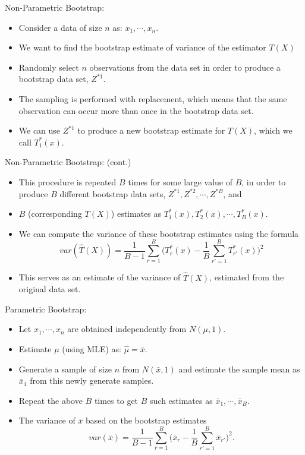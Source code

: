\documentclass[
  ignorenonframetext,
]{beamer}
\providecommand{\tightlist}{%
  \setlength{\itemsep}{0pt}\setlength{\parskip}{0pt}}
\begin{document}
\begin{frame}{Non-Parametric Bootstrap:}
\label{non-parametric-bootstrap}
\begin{itemize}
\tightlist
\item
  Consider a {data of size \(n\)} as: \(x_1, \cdots, x_n\).
\item
  We want to find the {bootstrap estimate of variance of the estimator
  \(T(X)\)}
\item
  {Randomly select \(n\) observations} from the data set in order to
  produce a bootstrap data set, \(Z^{*1}\).
\item
  The {sampling is performed with replacement,} which means that the
  same observation can occur more than once in the bootstrap data set.
\item
  We can use \(Z^{*1}\) to {produce a new bootstrap estimate} for
  \(T(X)\), which we call \(T_1^*(x)\).
\end{itemize}
\end{frame}

\begin{frame}{Non-Parametric Bootstrap: (cont.)}
\label{non-parametric-bootstrap-cont.}
\begin{itemize}
\tightlist
\item
  This procedure is {repeated \(B\) times} for some large value of
  \(B\), in order to produce \(B\) {different bootstrap data sets,}
  \(Z^{*1}, Z^{*2}, \cdots, Z^{*B}\), and
\item
  \(B\) (corresponding \(T(X)\)) estimates as
  \(T_1^*(x), T_2^*(x), \cdots, T_B^*(x)\).
\item
  We can compute the {variance of these bootstrap estimates} using the
  formula
  \[var(\hat T(X)) = \frac{1}{B-1} \sum_{r=1}^{B} \bigg(T_r^*(x) - \frac{1}{B}\sum_{r'=1}^{B} T_{r'}^*(x) \bigg)^2\]
\item
  This serves as an estimate of the variance of \(\hat T(X)\), estimated
  from the original data set.
\end{itemize}
\end{frame}

\begin{frame}{Parametric Bootstrap:}
\label{parametric-bootstrap}
\begin{itemize}
\tightlist
\item
  Let \(x_1, \cdots, x_n\) are {obtained independently from
  \(N(\mu, 1)\).}
\item
  Estimate \(\mu\) (using MLE) as: \(\hat \mu = \bar{x}\).
\item
  Generate a {sample of size \(n\) from \(N(\bar{x}, 1)\)} and estimate
  the sample mean as \(\bar{x}_1\) from this newly generate samples.
\item
  {Repeat the above \(B\) times to get \(B\) such estimates} as
  \(\bar{x}_1, \cdots, \bar{x}_B\).
\item
  The {variance of \(\bar{x}\) based on the bootstrap} estimates
  \[var(\bar{x}) = \frac{1}{B-1} \sum_{r=1}^{B} \bigg(\bar{x}_r - \frac{1}{B}\sum_{r'=1}^{B} \bar{x}_{r'} \bigg)^2.\]
\end{itemize}
\end{frame}
\end{document}
